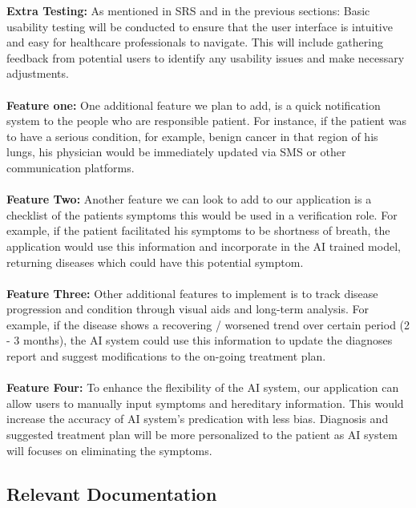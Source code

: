 \documentclass[12pt, titlepage]{article}
\begin{document}
\textbf{Extra Testing:}
As mentioned in SRS and in the previous sections: Basic usability testing will be conducted to ensure that the user interface is intuitive and easy for healthcare professionals to navigate. This will include gathering feedback from potential users to identify any usability issues and make necessary adjustments. \\\\  
\textbf{Feature one:}
One additional feature we plan to add, is a quick notification system to the people who are responsible patient. For instance, if the patient was to have a serious condition, for example, benign cancer in that region of his lungs, his physician would be immediately updated via SMS or other communication platforms. \\\\  
\textbf{Feature Two:}
Another feature we can look to add to our application is a checklist of the patients symptoms this would be used in a verification role. For example, if the patient facilitated his symptoms to be shortness of breath, the application would use this information and incorporate in the AI trained model, returning diseases which could have this potential symptom.\\\\  
\textbf{Feature Three:}
Other additional features to implement is to track disease progression and condition through visual aids and long-term analysis. For example, if the disease shows a recovering / worsened trend over certain period (2 - 3 months), the AI system could use this information to update the diagnoses report and suggest modifications to the on-going treatment plan. \\\\
\textbf{Feature Four:}
To enhance the flexibility of the AI system, our application can allow users to manually input symptoms and hereditary information. This would increase the accuracy of AI system's predication with less bias. Diagnosis and suggested treatment plan will be more personalized to the patient as AI system will focuses on eliminating the symptoms. \\
\subsection{Relevant Documentation}
\end{document}
